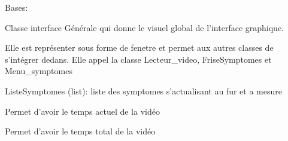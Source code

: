 \documentclass[letterpaper,10pt,english]{sphinxmanual}
\begin{document}
\begin{fulllineitems}
\label{\detokenize{general_interface:general_interface_V9.InterfaceGenerale}}
\pysigstartsignatures
{}
\pysigstopsignatures
\sphinxAtStartPar
Bases: 

\sphinxAtStartPar
Classe interface Générale qui donne le visuel global de l’interface graphique.

\sphinxAtStartPar
Elle est représenter sous forme de fenetre et permet aux autres classes de s’intégrer dedans.
Elle appel la classe Lecteur\_video, FriseSymptomes et Menu\_symptomes
\begin{description}
\sphinxAtStartPar
ListeSymptomes (list): liste des symptomes s’actualisant au fur et a mesure

\sphinxAtStartPar
{}

\end{description}

\begin{fulllineitems}
\label{\detokenize{general_interface:general_interface_V9.InterfaceGenerale.get_current_video_time}}
\pysigstartsignatures
{}
\pysigstopsignatures
\sphinxAtStartPar
Permet d’avoir le temps actuel de la vidéo

\end{fulllineitems}


\begin{fulllineitems}
\label{\detokenize{general_interface:general_interface_V9.InterfaceGenerale.get_video_duration}}
\pysigstartsignatures
{}
\pysigstopsignatures
\sphinxAtStartPar
Permet d’avoir le temps total de la vidéo

\end{fulllineitems}


\end{fulllineitems}
\end{document}
